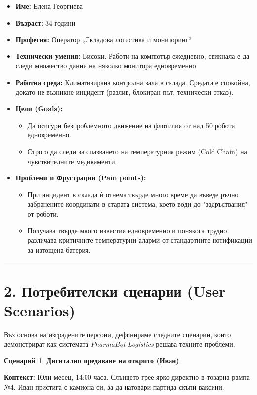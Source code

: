 \documentclass[12pt, a4paper]{article}
\begin{document}
\begin{itemize}
    \item \textbf{Име:} Елена Георгиева
    \item \textbf{Възраст:} 34 години
    \item \textbf{Професия:} Оператор „Складова логистика и мониторинг“
    \item \textbf{Технически умения:} Високи. Работи на компютър ежедневно, свикнала е да следи множество данни на няколко монитора едновременно.
    \item \textbf{Работна среда:} Климатизирана контролна зала в склада. Средата е спокойна, докато не възникне инцидент (разлив, блокиран път, технически отказ).
    \item \textbf{Цели (Goals):}
    \begin{itemize}
        \item Да осигури безпроблемното движение на флотилия от над 50 робота едновременно.
        \item Строго да следи за спазването на температурния режим (Cold Chain) на чувствителните медикаменти.
    \end{itemize}
    \item \textbf{Проблеми и Фрустрации (Pain points):}
    \begin{itemize}
        \item При инцидент в склада ѝ отнема твърде много време да въведе ръчно забранените координати в старата система, което води до "задръствания" от роботи.
        \item Получава твърде много известия едновременно и понякога трудно различава критичните температурни аларми от стандартните нотификации за изтощена батерия.
    \end{itemize}
\end{itemize}

\bigskip
\rule{\textwidth}{0.4pt}

\section*{2. Потребителски сценарии (User Scenarios)}

Въз основа на изградените персони, дефинираме следните сценарии, които демонстрират как системата \textit{PharmaBot Logistics} решава техните проблеми.

\bigskip
\noindent\textbf{Сценарий 1: Дигитално предаване на открито (Иван)}

\smallskip
\noindent\textbf{Контекст:} Юли месец, 14:00 часа. Слънцето грее ярко директно в товарна рампа №4. Иван пристига с камиона си, за да натовари партида скъпи ваксини.
\end{document}
